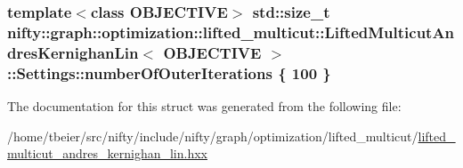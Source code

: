 \subsubsection[{number\+Of\+Outer\+Iterations}]{\setlength{\rightskip}{0pt plus 5cm}template$<$class O\+B\+J\+E\+C\+T\+I\+V\+E$>$ std\+::size\+\_\+t {\bf nifty\+::graph\+::optimization\+::lifted\+\_\+multicut\+::\+Lifted\+Multicut\+Andres\+Kernighan\+Lin}$<$ O\+B\+J\+E\+C\+T\+I\+V\+E $>$\+::Settings\+::number\+Of\+Outer\+Iterations \{ 100 \}}\label{structnifty_1_1graph_1_1optimization_1_1lifted__multicut_1_1LiftedMulticutAndresKernighanLin_1_1Settings_a8ce28bc7fc269024e281eb77221130b1}


The documentation for this struct was generated from the following file\+:\begin{DoxyCompactItemize}
\item 
/home/tbeier/src/nifty/include/nifty/graph/optimization/lifted\+\_\+multicut/\hyperlink{lifted__multicut__andres__kernighan__lin_8hxx}{lifted\+\_\+multicut\+\_\+andres\+\_\+kernighan\+\_\+lin.\+hxx}\end{DoxyCompactItemize}
